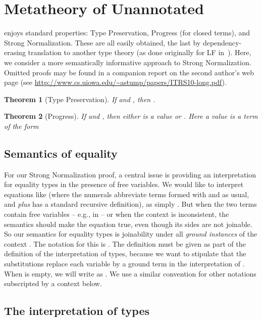 \documentclass[copyright]{eptcs}
\newtheorem{theorem}{Theorem}
\begin{document}
\section{Metatheory of Unannotated }
\label{sec:metatheory}

 enjoys standard properties: Type Preservation, Progress (for
closed terms), and Strong Normalization.  These are all easily
obtained, the last by dependency-erasing translation to another type
theory (as done originally for LF in~\cite{HHP93}).  Here, we consider
a more semantically informative approach to Strong Normalization.
Omitted proofs may be found in a companion report on the second
author's web page (see \url{http://www.cs.uiowa.edu/~astump/papers/ITRS10-long.pdf}).

\begin{theorem}[Type Preservation]
\label{thm:tppres}
If  and , then .
\end{theorem}

\begin{theorem}[Progress]
\label{thm:progress}
If  and , then either  is a value or  . Here a \emph{value} is a term of the form

\end{theorem}

\subsection{Semantics of equality}

For our Strong Normalization proof, a central issue is providing an
interpretation for equality types in the presence of free variables.
We would like to interpret equations like 
(where the numerals abbreviate terms formed with  and  as usual,
and \textit{plus} has a standard recursive definition), as simply
.  But when the two terms contain
free variables -- e.g., in  -- or when the context is inconsistent, the
semantics should make the equation true, even though its sides are not
joinable.  So our semantics for equality types is joinability under
all \emph{ground instances} of the context .  The notation for
this is .  The definition must be given as part of
the definition of the interpretation of types, because we want to
stipulate that the substitutions  replace each variable  by
a ground term in the interpretation of .  When
 is empty, we will write  as .  We
use a similar convention for other notations subscripted by a context
below.

\subsection{The interpretation of types}
\end{document}
